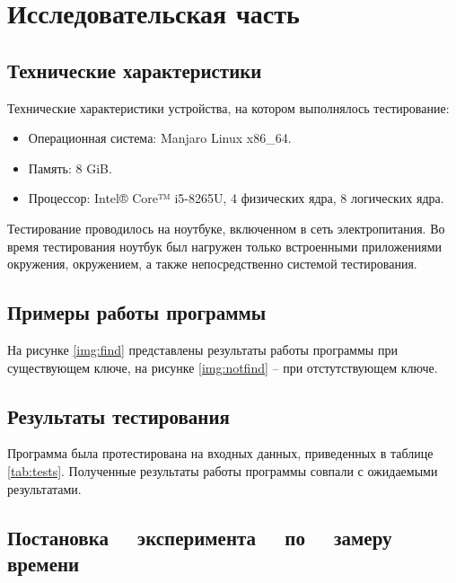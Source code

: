 \chapter{Исследовательская часть}

\section{Технические характеристики}

Технические характеристики устройства, на котором выполнялось тестирование:

\begin{itemize}
	\item Операционная система: Manjaro \cite{manjaro} Linux x86\_64.
	\item Память: 8 GiB.
    \item Процессор: Intel® Core™ i5-8265U, 4 физических ядра, 8 логических
        ядра\cite{intel}.
\end{itemize}

Тестирование проводилось на ноутбуке, включенном в сеть электропитания. Во
время тестирования ноутбук был нагружен только встроенными приложениями
окружения, окружением, а также непосредственно системой тестирования.

\section{Примеры работы программы}

На рисунке \ref{img:find} представлены результаты работы программы при
существующем ключе, на рисунке \ref{img:notfind} -- при отстутствующем ключе. 



\section{Результаты тестирования}

Программа была протестирована на входных данных, приведенных в таблице
\ref{tab:tests}. Полученные результаты работы программы совпали с ожидаемыми
результатами.

\section[Постановка эксперимента по замеру времени]
        {Постановка ~~эксперимента ~~по ~~замеру времени}

